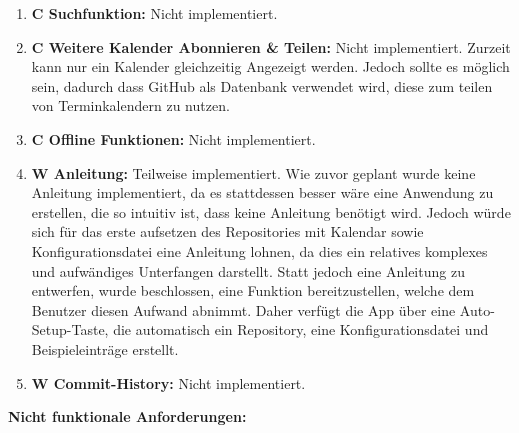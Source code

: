 \begin{enumerate}
	\item \textbf{C Suchfunktion:} %
		Nicht implementiert.%
	\item \textbf{C Weitere Kalender Abonnieren \& Teilen:} %
		Nicht implementiert. Zurzeit kann nur ein Kalender gleichzeitig Angezeigt werden. %
		Jedoch sollte es möglich sein, dadurch dass GitHub als Datenbank verwendet wird, diese zum teilen von Terminkalendern zu nutzen.%
	\item \textbf{C Offline Funktionen:} %
		Nicht implementiert.%
	\item \textbf{W Anleitung:} %
		Teilweise implementiert. Wie zuvor geplant wurde keine Anleitung implementiert, da es stattdessen besser wäre eine Anwendung zu erstellen, die so intuitiv ist, dass keine Anleitung benötigt wird. %
		Jedoch würde sich für das erste aufsetzen des Repositories mit Kalendar sowie Konfigurationsdatei eine Anleitung lohnen, da dies ein relatives komplexes und aufwändiges Unterfangen darstellt. Statt jedoch eine Anleitung zu entwerfen, wurde beschlossen, eine Funktion bereitzustellen, welche dem Benutzer diesen Aufwand abnimmt. Daher verfügt die App über eine Auto-Setup-Taste, die automatisch ein Repository, eine Konfigurationsdatei und Beispieleinträge erstellt.%
	\item \textbf{W Commit-History:}
		Nicht implementiert.%
\end{enumerate}%
%
\myNewSection
\textbf{Nicht funktionale Anforderungen:}
